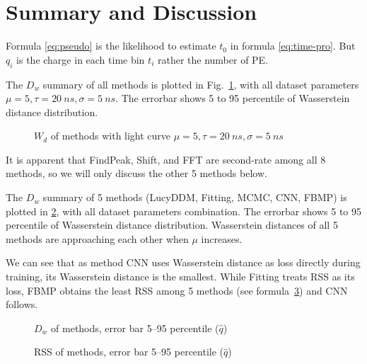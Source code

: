 \section{Summary and Discussion} %
\label{sec:discussion}


Formula \eqref{eq:pseudo} is the likelihood to estimate $t_{0}$ in formula \eqref{eq:time-pro}. But $q_{i}$ is the charge in each time bin $t_{i}$ rather the number of PE. 


The $D_w$ summary of all methods is plotted in Fig.~\ref{fig:chargesummary}, with all dataset parameters $\mu=5, \tau=\SI{20}{ns}, \sigma=\SI{5}{ns}$. The errorbar shows 5 to 95 percentile of Wasserstein distance distribution. 

\begin{figure}[H]
    \centering
    \scalebox{0.6}{}
    \caption{\label{fig:chargesummary} $W_{d}$ of methods with light curve $\mu=5, \tau=\SI{20}{ns}, \sigma=\SI{5}{ns}$}
\end{figure}

It is apparent that FindPeak, Shift, and FFT are second-rate among all 8 methods, so we will only discuss the other 5 methods below. 


The $D_w$ summary of 5 methods (LucyDDM, Fitting, MCMC, CNN, FBMP) is plotted in \ref{fig:wdistsummary}, with all dataset parameters combination. The errorbar shows 5 to 95 percentile of Wasserstein distance distribution. Wasserstein distances of all 5 methods are approaching each other when $\mu$ increases. 

We can see that as method CNN uses Wasserstein distance as loss directly during training, its Wasserstein distance is the smallest. While Fitting treats RSS as its loss, FBMP obtains the least RSS among 5 methods (see formula~\ref{fig:rsssummary}) and CNN follows. 

\begin{figure}[H]
    \centering
    \resizebox{\textwidth}{!}{}
    \caption{\label{fig:wdistsummary} $D_w$ of methods, error bar 5--95 percentile ($\hat{q}$)}
\end{figure}

\begin{figure}[H]
    \centering
    \resizebox{\textwidth}{!}{}
    \caption{\label{fig:rsssummary} RSS of methods, error bar 5--95 percentile ($\hat{q}$)}
\end{figure}

